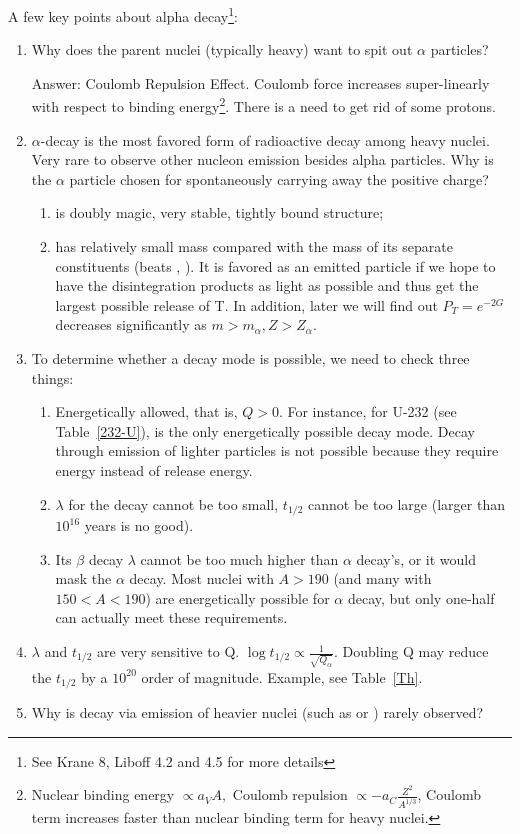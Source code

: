 \documentclass{school-22.101-notes}
\begin{document}
A few key points about alpha decay\footnote{See Krane 8, Liboff 4.2 and 4.5 for more details}:
\begin{enumerate} 
\item Why does the parent nuclei (typically heavy) want to spit out $\alpha$ particles? 

Answer: Coulomb Repulsion Effect. Coulomb force increases super-linearly with respect to binding energy\footnote{Nuclear binding energy $\propto a_V A,$ Coulomb repulsion $\propto -a_C \frac{Z^2}{A^{1/3}}$, Coulomb term increases faster than nuclear binding term for heavy nuclei.}. There is a need to get rid of some protons.  
\item $\alpha$-decay is the most favored form of radioactive decay among heavy nuclei. Very rare to observe other nucleon emission besides alpha particles. Why is the $\alpha$ particle chosen for spontaneously carrying away the positive charge?
    \begin{enumerate}
    \item {} is doubly magic, very stable, tightly bound structure;
    \item {} has relatively small mass compared with the mass of its separate constituents (beats , ). It is favored as an emitted particle if we hope to have the disintegration products as light as possible and thus get the largest possible release of T. In addition, later we will find out $P_T = e^{-2G}$ decreases significantly as $m > m_{\alpha}, Z > Z_{\alpha}.$
    \end{enumerate}
\item To determine whether a decay mode is possible, we need to check three things:
    \begin{enumerate}
    \item Energetically allowed, that is, $Q > 0$. For instance, for U-232 (see Table~\ref{232-U}),  is the only energetically possible decay mode. Decay through emission of lighter particles is not possible because they require energy instead of release energy.
    \item $\lambda$ for the decay cannot be too small, $t_{1/2}$ cannot be too large (larger than $10^{16}$ years is no good). 
    \item Its $\beta$ decay $\lambda$ cannot be too much higher than $\alpha$ decay's, or it would mask the $\alpha$ decay. Most nuclei with $A>190$ (and many with $150 < A < 190$) are energetically possible for $\alpha$ decay, but only one-half can actually meet these requirements.
    \end{enumerate}
\item $\lambda$ and $t_{1/2}$ are very sensitive to Q. $\log t_{1/2} \propto \frac{1}{\sqrt{Q_{\alpha}}}$. Doubling Q may reduce the $t_{1/2}$ by a $10^{20}$ order of magnitude. Example, see Table~\ref{Th}. 
\item Why is decay via emission of heavier nuclei (such as  or ) rarely observed? 


\end{enumerate}
\end{document}
